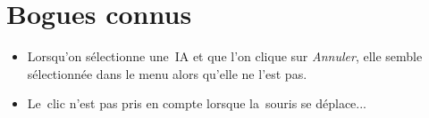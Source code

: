 \section{Bogues connus}
\begin{itemize}

	\item Lorsqu'on sélectionne une~IA et que l'on clique sur \textit{Annuler}, 
            elle semble sélectionnée dans le menu alors qu'elle ne l'est pas.
    
    \item Le~clic n'est pas pris en compte lorsque la~souris se déplace...
    
\end{itemize}